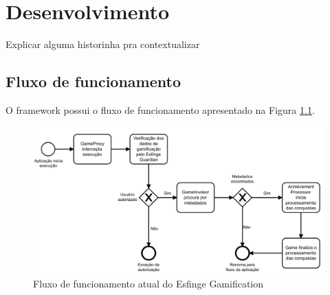 \newpage
\chapter{Desenvolvimento}
\label{ch:desenvolvimento}




\par Explicar alguma historinha pra contextualizar


\section{Fluxo de funcionamento}
\par O framework possui o fluxo de funcionamento apresentado na Figura \ref{fig:fluxo-atual}. 

\begin{figure}[H]
    \centering
    \includegraphics[scale=0.3]{src/imagens/cap3/fluxo-atual.png}
    \caption{Fluxo de funcionamento atual do Esfinge Gamification}
    \label{fig:fluxo-atual}
\end{figure}

